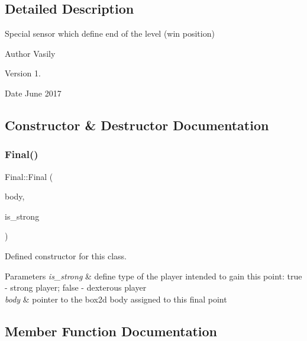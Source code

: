 \subsection{Detailed Description}
Special sensor which define end of the level (win position) 

\begin{DoxyAuthor}{Author}
Vasily 
\end{DoxyAuthor}
\begin{DoxyVersion}{Version}
1. 
\end{DoxyVersion}
\begin{DoxyDate}{Date}
June 2017 
\end{DoxyDate}


\subsection{Constructor \& Destructor Documentation}
\mbox{\label{class_final_ad8e4afdefd9ea952bfbb7123af09c710}} 
\subsubsection{\texorpdfstring{Final()}{Final()}}
{\footnotesize\ttfamily Final\+::\+Final (\begin{DoxyParamCaption}\item[{b2\+Body $\ast$}]{body,  }\item[{bool}]{is\+\_\+strong }\end{DoxyParamCaption})}



Defined constructor for this class. 


\begin{DoxyParams}{Parameters}
{\em is\+\_\+strong} & define type of the player intended to gain this point\+: \textquotesingle{}true\textquotesingle{} -\/ strong player; \textquotesingle{}false\textquotesingle{} -\/ dexterous player \\
\hline
{\em body} & pointer to the box2d body assigned to this final point \\
\hline
\end{DoxyParams}


\subsection{Member Function Documentation}
\mbox{\label{class_final_af7a2beabd2de1cc0fcbe017f2012e41c}} 

